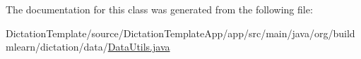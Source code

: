 The documentation for this class was generated from the following file\+:\begin{DoxyCompactItemize}
\item 
Dictation\+Template/source/\+Dictation\+Template\+App/app/src/main/java/org/buildmlearn/dictation/data/\hyperlink{DictationTemplate_2source_2DictationTemplateApp_2app_2src_2main_2java_2org_2buildmlearn_2dictation_2data_2DataUtils_8java}{Data\+Utils.\+java}\end{DoxyCompactItemize}
